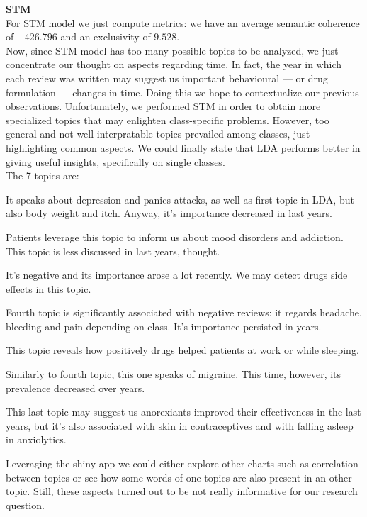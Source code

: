 \documentclass[10pt, a4paper, twocolumn]{article}
\begin{document}
            \textbf{STM}\\
            For STM model we just compute metrics: we have an average semantic coherence of $-426.796$ and an exclusivity of $9.528$.\\
            Now, since STM model has too many possible topics to be analyzed, we just concentrate our thought on aspects regarding time. In fact, the year in which each review was written may suggest us important behavioural --- or drug formulation --- changes in time. Doing this we hope to contextualize our previous observations. Unfortunately, we performed STM in order to obtain more specialized topics that may enlighten class-specific problems. However, too general and not well interpratable topics prevailed among classes, just highlighting common aspects. We could finally state that LDA performs better in giving useful insights, specifically on single classes.\\
            
            The 7 topics are:
            \begin{enumerate}[label=\textbf{[\arabic*]}]
                \item It speaks about depression and panics attacks, as well as first topic in LDA, but also body weight and itch. Anyway, it's importance decreased in last years.
                \item Patients leverage this topic to inform us about mood disorders and addiction. This topic is less discussed in last years, thought.
                \item It's negative and its importance arose a lot recently. We may detect drugs side effects in this topic.
                \item Fourth topic is significantly associated with negative reviews: it regards headache, bleeding and pain depending on class. It's importance persisted in years. 
                \item This topic reveals how positively drugs helped patients at work or while sleeping.
                \item Similarly to fourth topic, this one speaks of migraine. This time, however, its prevalence decreased over years.
                \item This last topic may suggest us anorexiants improved their effectiveness in the last years, but it's also associated with skin in contraceptives and with falling asleep in anxiolytics.
            \end{enumerate}
            Leveraging the shiny app we could either explore other charts such as correlation between topics or see how some words of one topics are also present in an other topic. Still, these aspects turned out to be not really informative for our research question.
            
\end{document}
